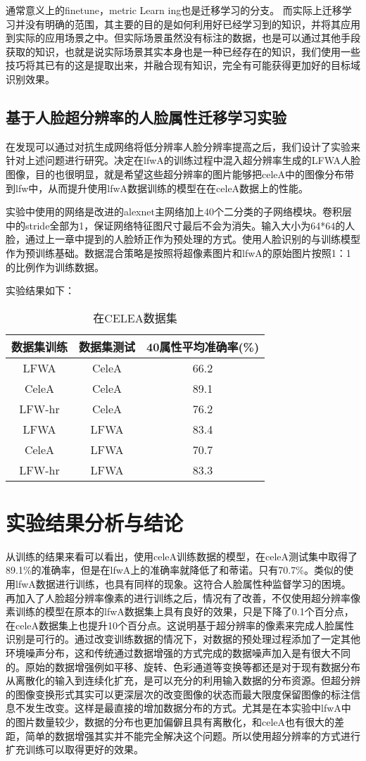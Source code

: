 通常意义上的finetune，metric Learn ing也是迁移学习的分支。
而实际上迁移学习并没有明确的范围，其主要的目的是如何利用好已经学习到的知识，并将其应用到实际的应用场景之中。但实际场景虽然没有标注的数据，也是可以通过其他手段获取的知识，也就是说实际场景其实本身也是一种已经存在的知识，我们使用一些技巧将其已有的这是提取出来，并融合现有知识，完全有可能获得更加好的目标域识别效果。
\subsection{基于人脸超分辨率的人脸属性迁移学习实验}
在发现可以通过对抗生成网络将低分辨率人脸分辨率提高之后，我们设计了实验来针对上述问题进行研究。决定在lfwA的训练过程中混入超分辨率生成的LFWA人脸图像，目的也很明显，就是希望这些超分辨率的图片能够把celeA中的图像分布带到lfw中，从而提升使用lfwA数据训练的模型在在celeA数据上的性能。

实验中使用的网络是改进的alexnet主网络加上40个二分类的子网络模块。卷积层中的stride全部为1，保证网络特征图尺寸最后不会为消失。输入大小为64*64的人脸，通过上一章中提到的人脸矫正作为预处理的方式。使用人脸识别的与训练模型作为预训练基础。数据混合策略是按照将超像素图片和lfwA的原始图片按照1：1的比例作为训练数据。

实验结果如下：
\begin{table}[!h]
  \centering
   \caption{在CELEA数据集}
   \begin{tabular}{c|c|c}
     \toprule
     数据集训练 &数据集测试 &40属性平均准确率(\%)\\
     \midrule
      LFWA   &  CeleA &  66.2 \\
	  CeleA  &  CeleA &  89.1 \\
	  LFW-hr &  CeleA &  76.2 \\
      LFWA   &  LFWA  &  83.4 \\
	  CeleA  &  LFWA  &  70.7 \\
	  LFW-hr &  LFWA  &  83.3 \\
     \bottomrule
   \end{tabular}
\end{table}
\section{实验结果分析与结论}
从训练的结果来看可以看出，使用celeA训练数据的模型，在celeA测试集中取得了89.1\%的准确率，但是在lfwA上的准确率就降低了和蒂诺。只有70.7\%。类似的使用lfwA数据进行训练，也具有同样的现象。这符合人脸属性种监督学习的困境。
再加入了人脸超分辨率像素的进行训练之后，情况有了改善，不仅使用超分辨率像素训练的模型在原本的lfwA数据集上具有良好的效果，只是下降了0.1个百分点，在celeA数据集上也提升10个百分点。这说明基于超分辨率的像素来完成人脸属性识别是可行的。通过改变训练数据的情况下，对数据的预处理过程添加了一定其他环境噪声分布，这和传统通过数据增强的方式完成的数据噪声加入是有很大不同的。原始的数据增强例如平移、旋转、色彩通道等变换等都还是对于现有数据分布从离散化的输入到连续化扩充，是可以充分的利用输入数据的分布资源。但超分辨的图像变换形式其实可以更深层次的改变图像的状态而最大限度保留图像的标注信息不发生改变。这样是最直接的增加数据分布的方式。尤其是在本实验中lfwA中的图片数量较少，数据的分布也更加偏僻且具有离散化，和celeA也有很大的差距，简单的数据增强其实并不能完全解决这个问题。所以使用超分辨率的方式进行扩充训练可以取得更好的效果。

